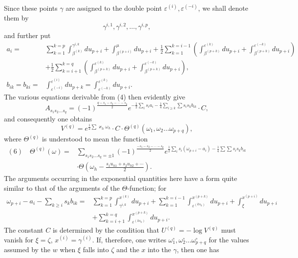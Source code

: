 \documentclass[10pt]{article}
\begin{document}
Since these points \(\gamma\) are assigned to the double point \(\varepsilon^{(i)},\varepsilon^{(-i)}\), we shall denote them by
\[
\gamma^{i,1},\gamma^{i,2},\ldots,\gamma^{i,p},
\]
and further put
\[
\begin{aligned}
a_i={}&\sum_{k=1}^{k=p}\int_{\beta^{(k)}}^{\gamma^{i,k}}du_{p+i}
+\int_{\beta^{(p+i)}}^{\mu}du_{p+i}
+\frac12\sum_{k=1}^{k=i-1}\left(\int_{\beta^{(p+k)}}^{\varepsilon^{(k)}}du_{p+i}+\int_{\beta^{(p+k)}}^{\varepsilon^{(-k)}}du_{p+i}\right)\\
&+\frac12\sum_{k=i+1}^{k=q}\left(\int_{\beta^{(p+k)}}^{\varepsilon^{(k)}}du_{p+i}+\int_{\beta^{(p+k)}}^{\varepsilon^{(-k)}}du_{p+i}\right),\\
b_{ik}=b_{ki}={}&\int_{\varepsilon^{(-i)}}^{\varepsilon^{(i)}}du_{p+k}=\int_{\varepsilon^{(-k)}}^{\varepsilon^{(k)}}du_{p+i}.
\end{aligned}
\]
The various equations derivable from (4) then evidently give
\[
A_{s_1s_2\ldots s_q}=(-1)^{\frac{q-s_1-s_2-\cdots-s_q}{2}}
 e^{-\frac12\sum_i s_ia_i-\frac14\sum_{i\ge k}\sum s_is_kb_{ik}}\cdot C,
\]
and consequently one obtains
\[
V^{(q)}=e^{\frac12\sum\varkappa_h\omega_h}\cdot C\cdot \Theta^{(q)}(\omega_1,\omega_2\ldots\omega_{p+q}),
\]
where \(\Theta^{(q)}\) is understood to mean the function
\[
\begin{aligned}
(6)\quad \Theta^{(q)}(\omega)={}&
\sum_{s_1s_2\ldots s_q=\pm1}
(-1)^{\frac{-s_1-s_2-\cdots-s_q}{2}}
 e^{\frac12\sum_i s_i(\omega_{p+i}-a_i)-\frac14\sum\sum s_is_kb_{ik}}\\
&\cdot\Theta\left(\omega_h-\frac{s_1u_{h1}+s_2u_{h2}+\cdots}{2}\right).
\end{aligned}
\]
The arguments occurring in the exponential quantities here have a form quite similar to that of the arguments of the \(\Theta\)-function; for
\[
\begin{aligned}
\omega_{p+i}-a_i-\sum_{k\ge i}s_kb_{ik}
={}&\sum_{k=1}^{k=p}\int_{\gamma^{i,k}}^{x^{(k)}}du_{p+i}
+\sum_{k=1}^{k=i-1}\int_{\varepsilon^{(ks_k)}}^{x^{(p+k)}}du_{p+i}
+\int_{\xi}^{x^{(p+i)}}du_{p+i}\\
&+\sum_{k=i+1}^{k=q}\int_{\varepsilon^{(ks_k)}}^{x^{(p+k)}}du_{p+i}.
\end{aligned}
\]
The constant \(C\) is determined by the condition that \(U^{(q)}=-\log V^{(q)}\) must vanish for \(\xi=\zeta\), \(x^{(i)}=\gamma^{(i)}\). If, therefore, one writes \(\omega_1^\circ,\omega_2^\circ\ldots\omega_{p+q}^\circ\) for the values assumed by the \(w\) when \(\xi\) falls into \(\zeta\) and the \(x\) into the \(\gamma\), then one has
\end{document}
